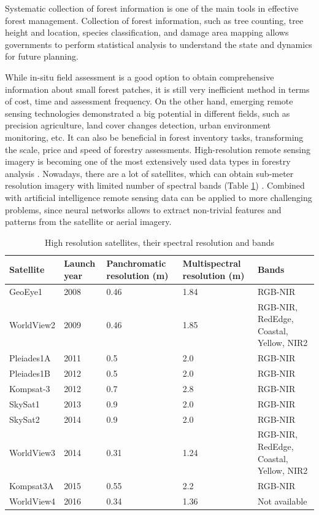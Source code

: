 Systematic collection of forest information is one of the main tools in effective forest management. Collection of forest information, such as tree counting, tree height and location, species classification, and damage area mapping allows governments to perform statistical analysis to understand the state and dynamics for future planning.

While in-situ field assessment is a good option to obtain comprehensive information about small forest patches, it is still very inefficient method in terms of cost, time and assessment frequency. On the other hand, emerging remote sensing technologies demonstrated a big potential in different fields, such as precision agriculture, land cover changes detection, urban environment monitoring, etc. It can also be beneficial in forest inventory tasks, transforming the scale, price and speed of forestry assessments. High-resolution remote sensing imagery is becoming one of the most extensively used data types in forestry analysis \cite{Tianyang2018}. Nowadays, there are a lot of satellites, which can obtain sub-meter resolution imagery with limited number of spectral bands (Table \ref{table1}) \cite{Gomes2016}. Combined with artificial intelligence remote sensing data can be applied to more challenging problems, since neural networks allows to extract non-trivial features and patterns from the satellite or aerial imagery. 

\begin{table}
\caption{High resolution satellites, their spectral resolution and bands}
\label{table1}
\vskip 0.15in
\begin{center}
\begin{small}
\begin{sc}
\begin{tabular}{l{3cm}p{2cm}p{2cm}p{2cm}p{3cm}}
\hline
\textbf{Satellite} & \textbf{Launch year} & \textbf{Panchromatic resolution (m)} & \textbf{Multispectral resolution (m)}& \textbf{Bands}\\\hline
GeoEye1 &2008  & 0.46 & 1.84 & RGB-\gls{NIR}\\\hline
WorldView2 &2009  & 0.46 & 1.85 & RGB-NIR, RedEdge, Coastal, Yellow, NIR2\\\hline
Pleiades1A &2011  & 0.5 & 2.0 & RGB-NIR\\\hline
Pleiades1B &2012  & 0.5 & 2.0 & RGB-NIR\\\hline
Kompsat-3 &2012  & 0.7 & 2.8 & RGB-NIR\\\hline
SkySat1 &2013  & 0.9 & 2.0 & RGB-NIR\\\hline
SkySat2 &2014  & 0.9 & 2.0 & RGB-NIR\\\hline
WorldView3 &2014  & 0.31 & 1.24 & RGB-NIR, RedEdge, Coastal, Yellow, NIR2\\\hline
Kompsat3A &2015  & 0.55 & 2.2 & RGB-NIR\\\hline
WorldView4 &2016  & 0.34 & 1.36 & Not available\\\hline
\end{tabular}
\end{sc}
\end{small}
\end{center}
\vskip -0.1in
\end{table}

